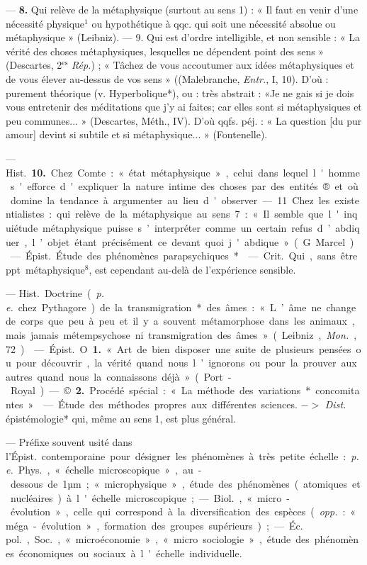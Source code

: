 \begin{itemize}[leftmargin=1cm, label=, itemsep=1pt]
 — {\bf 8.} Qui relève
de la métaphysique (surtout au
sens 1) : « Il faut en venir d’une
nécessité physique$^1$ ou hypothétique
à qqc. qui soit une nécessité absolue
ou métaphysique » (Leibniz). —
9. Qui est d’ordre intelligible, et non
sensible : « La vérité des choses métaphysiques, lesquelles ne dépendent point des sens » (Descartes,
2$^\text{es}$ {\it Rép.}) ; « Tâchez de vous accoutumer aux idées métaphysiques et
de vous élever au-dessus de vos
sens » ((Malebranche, {\it Entr.}, I, 10).
D'où : purement théorique (v. Hyperbolique*), ou : très abstrait : «Je ne
gais si je dois vous entretenir des
méditations que j'y ai faites; car
elles sont si métaphysiques et peu
communes... » (Descartes, Méth.,
IV). D'où qqfs. péj. : « La question
[du pur amour] devint si subtile et
si métaphysique... » (Fontenelle).

— \si{Hist.} {\bf 10.} Chez Comte : « état
métaphysique », celui dans lequel
l'homme s'efforce d'expliquer la
nature intime des choses par des
entités® et où domine la tendance à
argumenter au lieu d'observer. —
11. Chez les existentialistes : qui
relève de la métaphysique au sens 7 :
« Il semble que l'inquiétude métaphysique puisse s’interpréter comme
un certain refus d’abdiquer, l’objet
étant précisément ce devant quoi
j'abdique » (G. Marcel).

 — \si{Épist.} Étude des
phénomènes parapsychiques*.

 — \si{Crit.} Qui, sans être
ppt. métaphysique$^8$, est cependant
au-delà de l'expérience sensible.

 — \si{Hist.} Doctrine ({\it p. e.}
chez Pythagore) de la transmigration* des âmes : « L’âme ne change
de corps que peu à peu. et il y a
souvent métamorphose dans les
animaux, mais jamais métempsychose ni transmigration des âmes »
(Leibniz, {\it Mon.}, 72).

 — \si{Épist.} O {\bf 1.} « Art de bien
disposer une suite de plusieurs
pensées ou pour découvrir, la vérité
quand nous l’ignorons ou pour la
prouver aux autres quand nous la
connaissons déjà » (Port-Royal). —
©. {\bf 2.} Procédé spécial : « La méthode
des variations* concomitantes ».

 — Étude des méthodes
propres aux différentes sciences.
$->$ {\it Dist.} épistémologie* qui, même
au sens 1, est plus général.

 — Préfixe souvent usité dans
l'\si{Épist.} contemporaine pour désigner les phénomènes à très petite
échelle : {\it p. e.} \si{Phys.}, « échelle microscopique », au-dessous de 1µm ;
« microphysique », étude des phénomènes (atomiques et nucléaires) à
l'échelle microscopique; — \si{Biol.},
« micro-évolution », celle qui correspond à la diversification des espèces
({\it opp.} : « méga-évolution », formation
des groupes supérieurs) ; — \si{Éc. pol.},
\si{Soc.}, « microéconomie », « micro
sociologie », étude des phénomènes
économiques ou sociaux à l'échelle
individuelle.


\end{itemize}
